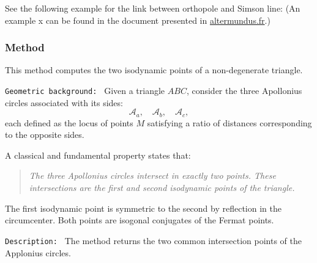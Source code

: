 See the following example for the link between orthopole and Simson line: (An example x
can be found  in the document  presented in \href{http://altermundus.fr}{altermundus.fr}.)

\begin{tkzexample}[latex=.5\textwidth]
\begin{center}
\end{center}
\end{tkzexample}

\subsubsection{Method }
\label{ssub:isodynamic_points}

This method computes the two isodynamic points of a non-degenerate triangle.

\medskip

\texttt{Geometric background: }
Given a triangle $ABC$, consider the three Apollonius circles associated with its sides:
\[
\mathcal{A}_{a},\quad \mathcal{A}_{b},\quad \mathcal{A}_{c},
\]
each defined as the locus of points $M$ satisfying a ratio of distances
corresponding to the opposite sides.

A classical and fundamental property states that:

\begin{quote}
\emph{The three Apollonius circles intersect in exactly two points.
These intersections are the first and second isodynamic points of the triangle.}
\end{quote}

The first isodynamic point is symmetric to the second by reflection in the
circumcenter. Both points are isogonal conjugates of the Fermat points.

\medskip

\texttt{Description: }
The method   returns the two common intersection points of the Applonius circles.

